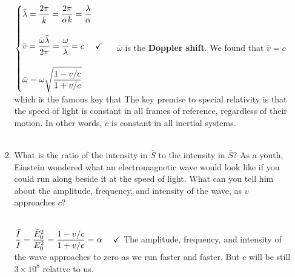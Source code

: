 \documentclass[fleqn]{article}
\begin{document}
\begin{enumerate}
\begin{enumerate}
        \textcolor{hwColor}{
          \\
          $
            \begin{cases}
              \bar{\lambda}=\dfrac{2 \pi}{\bar{k}}=\dfrac{2 \pi}{\alpha k}=\dfrac{\lambda}{\alpha}
              \\
              \\
              \bar{v}=\dfrac{\bar{\omega} \bar{\lambda}}{2 \pi}=\dfrac{\omega}{\lambda}=c ~~~~ \checkmark
              \\
              \\
              \bar{\omega}=\omega \sqrt{\dfrac{1-v/c}{1+v/c}}
            \end{cases}
            \\
            \\
          $
          $\bar{\omega}$ is the \textbf{Doppler shift}. We found that $\bar{v}=c$ which is the famous key that
          The key premise to special relativity is that the speed of light is constant in all frames 
          of reference, regardless of their motion. In other words, $c$ is constant in all inertial systems.
          \\
          \\
        }

      \item What is the ratio of the intensity in $\bar{S}$ to the intensity in $\bar{S}$? As a youth, Einstein wondered what an 
      electromagnetic wave would look like if you could run along beside it at the speed of light. What can you tell him 
      about the amplitude, frequency, and intensity of the wave, as $v$ approaches $c$?

        \textcolor{hwColor}{
          \\
          $
            \dfrac{\bar{I}}{I}=\dfrac{\bar{E}^2_0}{E^2_0}=\dfrac{1-v/c}{1+v/c}=\alpha ~~~~ \checkmark
            \\
            \\
          $
          The amplitude, frequency, and intensity of the wave approaches to zero as we run faster and faster. But $c$
          will be still $3 \times 10^{8}$ relative to us.
        }

    \end{enumerate}

  \end{enumerate}
\end{document}
